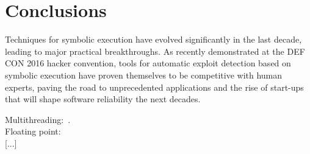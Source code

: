 
\section{Conclusions}
\label{se:conclusions}

Techniques for symbolic execution have evolved significantly in the last decade, leading to major practical breakthroughs. As recently demonstrated at the DEF CON 2016 hacker convention, tools for automatic exploit detection based on symbolic execution have proven themselves to be competitive with human experts, paving the road to unprecedented applications and the rise of start-ups that will shape software reliability the next decades.

Multithreading:~\cite{KPV-TACAS03,SA-HVC06,CLOUD9-EUROSYS11,FHR-ESEC13,BGC-OOPSLA14,GKW-ESEC15}.\\


Floating point:~\cite{M-STVR01,BGM-STVR06,LTH-ICTSS10,CCK-EUROSYS11,BVL-POPL13,CCK-TSE14,RPW-SIGSOFT15}\\


[...]
